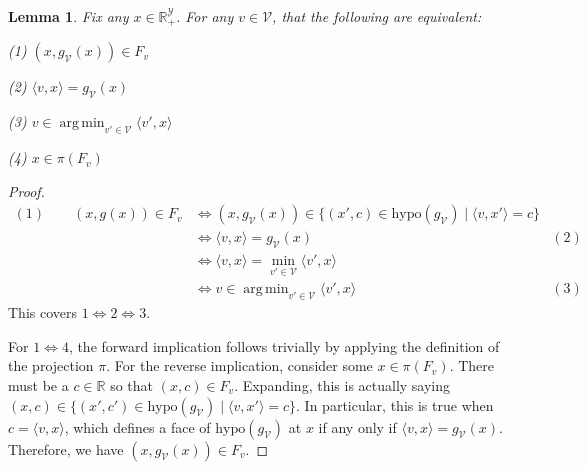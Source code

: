\documentclass[11pt]{article}
\newcommand{\reals}{\mathbb{R}}
\newcommand{\V}{\mathcal{V}}
\newcommand{\Y}{\mathcal{Y}}
\newcommand{\inprod}[2]{\langle #1, #2 \rangle}%
\newcommand{\hyp}{\mathrm{hypo}}
\DeclareMathOperator*{\argmin}{arg\,min}
\newtheorem{lemma}{Lemma}
\begin{document}
\begin{lemma}\label{lem:projected-faces-iff-support-iff-argmin}
	Fix any $x \in \reals^\Y_+$.
	For any $v \in \V$, that the following are equivalent: 
	
	
	(1) $(x,g_\V(x)) \in F_v$
	
	(2) $\inprod{v}{x}= g_\V(x)$
	
	(3) $v \in \argmin_{v' \in \V} \inprod{v'}{x}$
	
	(4) $x \in \pi(F_v)$
\end{lemma}
\begin{proof}
	\begin{align*}
	(1) \quad \quad (x,g(x)) \in F_v
	&\iff (x,g_\V(x)) \in \{(x',c) \in \hyp(g_\V) \mid \inprod{v}{x'} = c\} & \\
	&\iff  \inprod{v}{x} = g_\V(x) & (2)\\
	&\iff \inprod{v}{x} = \min_{v' \in \V}\inprod{v'}{x} & \\
	&\iff v \in \argmin_{v' \in \V}\inprod{v'}{x} & (3)
	\end{align*}
	This covers $1 \iff 2 \iff 3$.
	
	For $1 \iff 4$, the forward implication follows trivially by applying the definition of the projection $\pi$.
	For the reverse implication, consider some $x \in \pi(F_v)$.
	There must be a $c \in \reals$ so that $(x,c) \in F_v$.
	Expanding, this is actually saying $(x,c) \in \{(x',c') \in \hyp(g_\V) \mid \inprod{v}{x'} = c\}$.
	In particular, this is true when $c = \inprod{v}{x}$, which defines a face of $\hyp(g_\V)$ at $x$ if any only if $\inprod{v}{x} = g_\V(x)$.
	Therefore, we have $(x, g_\V(x)) \in F_v$.
\end{proof}
\end{document}
